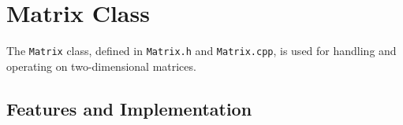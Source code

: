 \begin{itemize}
\end{itemize}

\section{Matrix Class}
\label{sec:matrix_class}

The \texttt{Matrix} class, defined in \texttt{Matrix.h} and \texttt{Matrix.cpp}, is used for handling and operating on two-dimensional matrices.

\begin{figure}

\end{figure}

\subsection{Features and Implementation}
